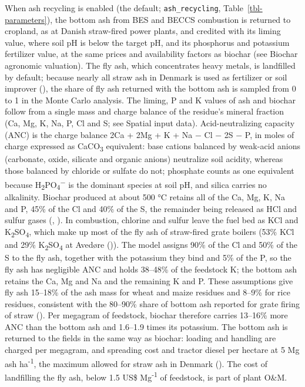 \documentclass[
  letterpaper,
]{article}
\begin{document}
When ash recycling is enabled (the default; \texttt{ash\_recycling},
Table~\ref{tbl-parameters}), the bottom ash from BES and BECCS
combustion is returned to cropland, as at Danish straw-fired power
plants, and credited with its liming value, where soil pH is below the
target pH, and its phosphorus and potassium fertilizer value, at the
same prices and availability factors as biochar (see Biochar agronomic
valuation). The fly ash, which concentrates heavy metals, is landfilled
by default; because nearly all straw ash in Denmark is used as
fertilizer or soil improver (), the
share of fly ash returned with the bottom ash is sampled from 0 to 1 in
the Monte Carlo analysis. The liming, P and K values of ash and biochar
follow from a single mass and charge balance of the residue's mineral
fraction (Ca, Mg, K, Na, P, Cl and S; see Spatial input data).
Acid-neutralizing capacity (ANC) is the charge balance 2Ca + 2Mg + K +
Na − Cl − 2S − P, in moles of charge expressed as CaCO\textsubscript{3}
equivalent: base cations balanced by weak-acid anions (carbonate, oxide,
silicate and organic anions) neutralize soil acidity, whereas those
balanced by chloride or sulfate do not; phosphate counts as one
equivalent because
H\textsubscript{2}PO\textsubscript{4}\textsuperscript{−} is the dominant
species at soil pH, and silica carries no alkalinity. Biochar produced
at about 500 °C retains all of the Ca, Mg, K, Na and P, 45\% of the Cl
and 40\% of the S, the remainder being released as HCl and sulfur gases
(,
). In combustion, chlorine and
sulfur leave the fuel bed as KCl and
K\textsubscript{2}SO\textsubscript{4}, which make up most of the fly ash
of straw-fired grate boilers (53\% KCl and 29\%
K\textsubscript{2}SO\textsubscript{4} at Avedøre
()). The model assigns 90\% of the
Cl and 50\% of the S to the fly ash, together with the potassium they
bind and 5\% of the P, so the fly ash has negligible ANC and holds
38--48\% of the feedstock K; the bottom ash retains the Ca, Mg and Na
and the remaining K and P. These assumptions give fly ash 15--18\% of
the ash mass for wheat and maize residues and 8--9\% for rice residues,
consistent with the 80--90\% share of bottom ash reported for grate
firing of straw (). Per megagram of
feedstock, biochar therefore carries 13--16\% more ANC than the bottom
ash and 1.6--1.9 times its potassium. The bottom ash is returned to the
fields in the same way as biochar: loading and handling are charged per
megagram, and spreading cost and tractor diesel per hectare at 5 Mg ash
ha\textsuperscript{-1}, the maximum allowed for straw ash in Denmark
(). The cost of landfilling the fly
ash, below 1.5 US\$ Mg\textsuperscript{-1} of feedstock, is part of
plant O\&M.
\end{document}

